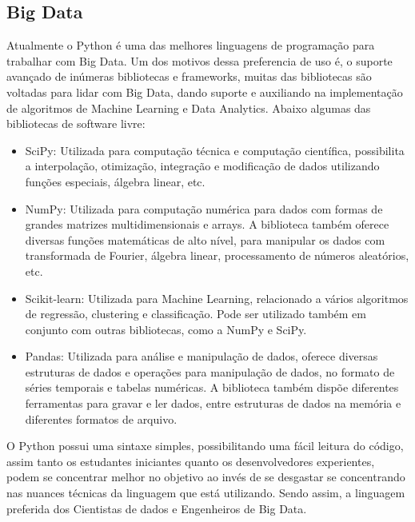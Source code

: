        \subsection{Big Data}
        Atualmente o Python é uma das melhores linguagens de programação para trabalhar com Big Data. Um dos motivos dessa preferencia de uso é, o suporte avançado de inúmeras bibliotecas e frameworks, muitas das bibliotecas são voltadas para lidar com Big Data, dando suporte e auxiliando na implementação  de algoritmos de Machine Learning e Data Analytics. Abaixo algumas das bibliotecas de software livre:
        \begin{itemize}
        	\item SciPy: Utilizada para computação técnica e computação científica, possibilita a interpolação, otimização, integração e modificação de dados utilizando funções especiais, álgebra linear, etc.
        	
        	\item NumPy: Utilizada para computação numérica para dados com formas de grandes matrizes multidimensionais e arrays. A biblioteca também oferece diversas funções matemáticas de alto nível, para manipular os dados com transformada de Fourier, álgebra linear, processamento de números aleatórios, etc.
        	
        	\item Scikit-learn: Utilizada para Machine Learning, relacionado a vários algoritmos de regressão, clustering e classificação. Pode ser utilizado também em conjunto com outras bibliotecas, como a NumPy e SciPy.
        	
        	\item Pandas: Utilizada para análise e manipulação de dados, oferece diversas estruturas de dados e operações para manipulação de dados, no formato de séries temporais e tabelas numéricas. A biblioteca também dispõe diferentes ferramentas para gravar e ler dados, entre estruturas de dados na memória e diferentes formatos de arquivo.
        \end{itemize}
        
        O Python possui uma sintaxe simples, possibilitando uma fácil leitura do código, assim tanto os estudantes iniciantes quanto os desenvolvedores experientes, podem se concentrar melhor no objetivo ao invés de se desgastar se concentrando nas nuances técnicas da linguagem que está utilizando. Sendo assim, a linguagem preferida dos Cientistas de dados e Engenheiros de Big Data. 
        
